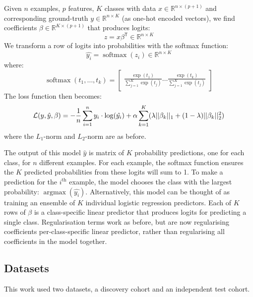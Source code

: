 \documentclass[draft]{article} %
\DeclareMathOperator*{\argmax}{argmax}
\DeclareMathOperator*{\softmax}{softmax}
\newcommand{\equationname}[1]{%
    \begingroup
        \leavevmode
        \addcontentsline{equ}{equations}{\protect\numberline{\theequation}#1}%
    \endgroup   
}
\begin{document}
Given \(n\) examples, \(p\) features, \(K\) classes with data \(x \in \mathbb{R}^{n \times (p + 1)}\) and corresponding ground-truth \(y \in \mathbb{R}^{n \times K}\) (as one-hot encoded vectors), we find coefficients \(\beta \in \mathbb{R}^{K \times (p + 1)}\) that produces logits:
\[z = x \beta^\mathsf{T} \in \mathbb{R}^{n \times K}\]
We transform a row of logits into probabilities with the softmax function:
\[\hat{y_i} = \softmax(z_i) \in \mathbb{R}^{n \times K}\]
where:
\[\softmax(t_1,\hdots , t_k) =
    \begin{bmatrix}
        \frac{\exp(t_1)}{\sum_{j=1}^{K} \exp(t_j)}
        \hdots
        \frac{\exp(t_k)}{\sum_{j=1}^{K} \exp(t_j)}
    \end{bmatrix}
\]
The loss function then becomes:
\begin{equation} \equationname{Elastic Net logistic regression} \label{eqn:mc_log_elastic_net}
    \mathcal{L}(y, \hat{y}, \beta) = -\frac{1}{n}\sum_{i=1}^{n} y_i \cdot \log(\hat{y_i}) + \alpha\sum_{k=1}^{K}(\lambda||\beta_k||_1 + (1 - \lambda)||\beta_k||_2^2)
\end{equation}
where the \(L_1\)-norm and \(L_2\)-norm are as before.

The output of this model \(\hat{y}\) is matrix of \(K\) probability predictions, one for each class, for \(n\) different examples. For each example, the softmax function ensures the \(K\) predicted probabilities from these logits will sum to 1. To make a prediction for the \(i^\text{th}\) example, the model chooses the class with the largest probability: \(\argmax(\hat{y_i})\). Alternatively, this model can be thought of as training an ensemble of \(K\) individual logistic regression predictors. Each of \(K\) rows of \(\beta\) is a class-specific linear predictor that produces logits for predicting a single class. Regularisation terms work as before, but are now regularising coefficients per-class-specific linear predictor, rather than regularising all coefficients in the model together.

\subsection{Datasets}
This work used two datasets, a discovery cohort and an independent test cohort.
\end{document}
